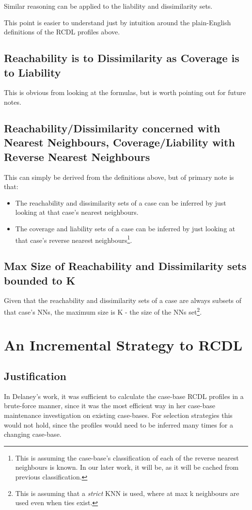 \documentclass[a4paper,11pt]{report}
\begin{document}
Similar reasoning can be applied to the liability and dissimilarity sets.

This point is easier to understand just by intuition around the plain-English definitions of the RCDL profiles above.

\subsection{Reachability is to Dissimilarity as Coverage is to Liability}
This is obvious from looking at the formulas, but is worth pointing out for future notes.

\subsection{Reachability/Dissimilarity concerned with Nearest Neighbours, Coverage/Liability with Reverse Nearest Neighbours \label{sec:RdWithNnClWithRnn}}
This can simply be derived from the definitions above, but of primary note is that:
\begin{itemize}
	\item The reachability and dissimilarity sets of a case can be inferred by just looking at that case's nearest neighbours.
	\item The coverage and liability sets of a case can be inferred by just looking at that case's reverse nearest neighbours\footnote{This is assuming the case-base's classification of each of the reverse nearest neighbours is known. In our later work, it will be, as it will be cached from previous classification.}.
\end{itemize}

\subsection{Max Size of Reachability and Dissimilarity sets bounded to K}
Given that the reachability and dissimilarity sets of a case are always subsets of that case's NNs, the maximum size is K - the size of the NNs set\footnote{This is assuming that a \emph{strict} KNN is used, where at max k neighbours are used even when ties exist.}.

\section{An Incremental Strategy to RCDL}
\subsection{Justification} 
In Delaney's work, it was sufficient to calculate the case-base RCDL profiles in a brute-force manner, since it was the most efficient way in her case-base maintenance investigation on existing case-bases. For selection strategies this would not hold, since the profiles would need to be inferred many times for a changing case-base.
\end{document}
